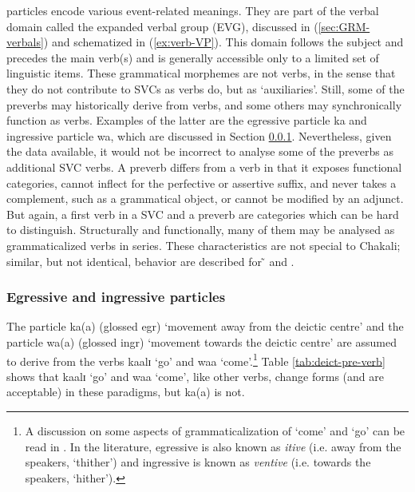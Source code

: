 \begin{exe}
\begin{exe}
\begin{exe}
\begin{exe}
\begin{exe}
\begin{exe}
\begin{exe}
\begin{exe}
\begin{exe}
\begin{exe}
\begin{exe}
 particles  encode various event-related meanings. They are part of the verbal domain  called the expanded verbal group (EVG), discussed in (\ref{sec:GRM-verbals}) and schematized in  (\ref{ex:verb-VP}). This domain  follows the subject and precedes the main verb(s) and is generally accessible  only to a limited set of linguistic items. These grammatical morphemes are not verbs, in the sense that they do not contribute to SVCs as verbs do,  but as `auxiliaries'. Still,  some of the preverbs may historically derive from verbs, and  some others may synchronically function as verbs.  Examples of the latter are the egressive particle {\sls ka} and ingressive particle {\sls wa},  which are discussed in Section \ref{sec:GRM-EVC-egr-ingr}. Nevertheless, given the data available,  it would not be incorrect to analyse some of the preverbs  as additional SVC verbs.  A preverb differs from a verb in that it exposes functional categories,  cannot inflect for the perfective or assertive suffix,  and never takes  a complement, such as a grammatical object, or cannot be modified by  an adjunct.  But again,  a first verb in a SVC and a preverb are categories which can be hard to distinguish. Structurally and functionally, many of them may be analysed as grammaticalized verbs in series. These characteristics are not special to Chakali; similar, but not identical, behavior are described for ̃ and  \citep{Daku07b, Daku08}.


\subsubsection{Egressive and ingressive particles}
\label{sec:GRM-EVC-egr-ingr}


The  particle {\sls ka(a)} (glossed {\sc egr})   `movement away from the deictic centre'  and   the  particle {\sls wa(a)} (glossed {\sc ingr})  `movement towards the deictic centre' are  assumed to derive from the  verbs {\sls kaalɪ} `go' and  {\sls waa} `come'.\footnote{A discussion on some aspects of grammaticalization of  `come' and `go' can be read in  \citet{Bour92}. In the literature, egressive  is also known as  {\it itive} (i.e. away from the speakers,  `thither')  and  ingressive  is  known as {\it ventive} (i.e. towards the speakers,   `hither'). }  Table \ref{tab:deict-pre-verb} shows that  {\sls kaalɪ} `go' and {\sls waa} `come',  like other verbs, change forms (and are acceptable) in these paradigms,  but {\sls ka(a)}  is  not.



\end{exe}
\end{exe}
\end{exe}
\end{exe}
\end{exe}
\end{exe}
\end{exe}
\end{exe}
\end{exe}
\end{exe}
\end{exe}
